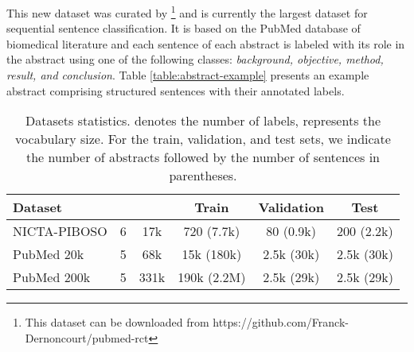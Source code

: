 \documentclass[11pt,a4paper]{article}
\begin{document}
This new dataset was curated by \cite{dernoncourt2017pubmed}\footnote{This dataset can be downloaded from https://github.com/Franck-Dernoncourt/pubmed-rct} and is currently the largest dataset for sequential sentence classification. It is based on the PubMed database of biomedical literature and each sentence of each abstract is labeled with its role in the abstract using one of the following classes: \textit{background, objective, method, result, and conclusion}. Table \ref{table:abstract-example} presents an example abstract comprising structured sentences with their annotated labels. 


\begin{table*}[h!]
\centering
\begin{tabular}{|l|c|c|c|c|c|}
\hline
\textbf{Dataset} & \textbf{} & \textbf{} & Train & Validation & Test \\ \hline
NICTA-PIBOSO            & 6            & 17k          & 720 (7.7k)       & 80 (0.9k)           & 200 (2.2k)      \\ \hline
PubMed 20k       & 5            & 68k          & 15k (180k)     & 2.5k (30k)          & 2.5k (30k)    \\ \hline
PubMed 200k      & 5            & 331k         & 190k (2.2M)    & 2.5k (29k)          & 2.5k (29k)    \\ \hline
\end{tabular}
\caption{Datasets statistics.  denotes the number of labels,  represents the vocabulary size. For the train, validation, and test sets, we indicate the number of abstracts followed by the number of sentences in parentheses.}
\label{table:data-statistics}
\end{table*}
\end{document}
